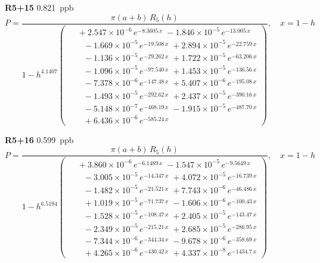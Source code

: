 \documentclass[12pt]{article}
\begin{document}
\noindent\textbf{R5+15} 0.821~ppb\nopagebreak
\begin{equation*}
P = \frac{\pi(a{+}b)\,R_5(h)}{1 - h^{4.1407}\!\left(\!\begin{aligned}
  &\; +2.547{\times}10^{-6}\,e^{-8.3605\,x} \; -1.846{\times}10^{-5}\,e^{-13.005\,x} \\[-3pt]
  &\quad -1.669{\times}10^{-5}\,e^{-19.508\,x} \; +2.894{\times}10^{-5}\,e^{-22.759\,x} \\[-3pt]
  &\quad -1.136{\times}10^{-5}\,e^{-29.262\,x} \; +1.722{\times}10^{-5}\,e^{-63.206\,x} \\[-3pt]
  &\quad -1.096{\times}10^{-5}\,e^{-97.540\,x} \; +1.453{\times}10^{-5}\,e^{-136.56\,x} \\[-3pt]
  &\quad -7.378{\times}10^{-6}\,e^{-147.48\,x} \; +5.407{\times}10^{-6}\,e^{-195.08\,x} \\[-3pt]
  &\quad -1.493{\times}10^{-5}\,e^{-292.62\,x} \; +2.437{\times}10^{-5}\,e^{-390.16\,x} \\[-3pt]
  &\quad -5.148{\times}10^{-7}\,e^{-468.19\,x} \; -1.915{\times}10^{-5}\,e^{-487.70\,x} \\[-3pt]
  &\quad +6.436{\times}10^{-6}\,e^{-585.24\,x}
\end{aligned}\!\right)}, \quad x = 1{-}h
\end{equation*}

\noindent\textbf{R5+16} 0.599~ppb\nopagebreak
\begin{equation*}
P = \frac{\pi(a{+}b)\,R_5(h)}{1 - h^{6.5194}\!\left(\!\begin{aligned}
  &\; +3.860{\times}10^{-6}\,e^{-6.1489\,x} \; -1.547{\times}10^{-5}\,e^{-9.5649\,x} \\[-3pt]
  &\quad -3.005{\times}10^{-5}\,e^{-14.347\,x} \; +4.072{\times}10^{-5}\,e^{-16.739\,x} \\[-3pt]
  &\quad -1.482{\times}10^{-5}\,e^{-21.521\,x} \; +7.743{\times}10^{-6}\,e^{-46.486\,x} \\[-3pt]
  &\quad +1.019{\times}10^{-5}\,e^{-71.737\,x} \; -1.606{\times}10^{-6}\,e^{-100.43\,x} \\[-3pt]
  &\quad -1.528{\times}10^{-5}\,e^{-108.47\,x} \; +2.405{\times}10^{-5}\,e^{-143.47\,x} \\[-3pt]
  &\quad -2.349{\times}10^{-5}\,e^{-215.21\,x} \; +2.685{\times}10^{-5}\,e^{-286.95\,x} \\[-3pt]
  &\quad -7.344{\times}10^{-6}\,e^{-344.34\,x} \; -9.678{\times}10^{-6}\,e^{-358.69\,x} \\[-3pt]
  &\quad +4.265{\times}10^{-6}\,e^{-430.42\,x} \; +4.337{\times}10^{-8}\,e^{-1434.7\,x}
\end{aligned}\!\right)}, \quad x = 1{-}h
\end{equation*}
\end{document}
